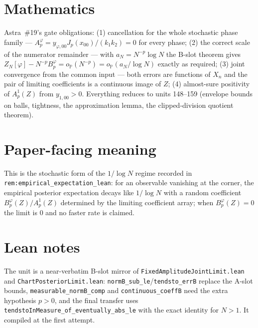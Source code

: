 \documentclass[11pt]{article}
\begin{document}
\section{Mathematics}
Astra~\#19's gate obligations: (1) cancellation for the whole stochastic phase family ---
$A^\varphi_p=y_{\varphi,00}J_p(x_{00})/(k_1k_2)=0$ for every phase; (2) the correct scale of the
numerator remainder --- with $a_N=N^{-p}\log N$ the B-slot theorem gives
$Z_N[\varphi]-N^{-p}B^\varphi_p=o_{\mathbb P}(N^{-p})=o_{\mathbb P}(a_N/\log N)$ exactly as required;
(3) joint convergence from the common input --- both errors are functions of $X_n$ and the pair of
limiting coefficients is a continuous image of $Z$; (4) almost-sure positivity of $A^1_p(Z)$ from
$y_{1,00}>0$. Everything reduces to units 148--159 (envelope bounds on balls, tightness, the
approximation lemma, the clipped-division quotient theorem).

\section{Paper-facing meaning}
This is the stochastic form of the $1/\log N$ regime recorded in \texttt{rem:empirical\_expectation\_lean}:
for an observable vanishing at the corner, the empirical posterior expectation decays like
$1/\log N$ with a random coefficient $B^\varphi_p(Z)/A^1_p(Z)$ determined by the limiting
coefficient array; when $B^\varphi_p(Z)=0$ the limit is $0$ and no faster rate is claimed.

\section{Lean notes}
The unit is a near-verbatim B-slot mirror of \texttt{FixedAmplitudeJointLimit.lean} and
\texttt{ChartPosteriorLimit.lean}: \texttt{normB\_sub\_le}/\texttt{tendsto\_errB} replace the A-slot
bounds, \texttt{measurable\_normB\_comp} and \texttt{continuous\_coeffB} need the extra hypothesis
$p>0$, and the final transfer uses \texttt{tendstoInMeasure\_of\_eventually\_abs\_le} with the exact
identity for $N>1$. It compiled at the first attempt.
\end{document}
